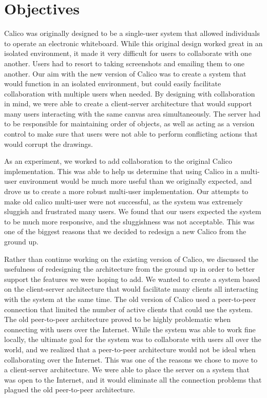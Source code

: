 \chapter{Objectives}

Calico was originally designed to be a single-user system that allowed individuals to operate an electronic whiteboard. While this original design worked great in an isolated environment, it made it very difficult for users to collaborate with one another. Users had to resort to taking screenshots and emailing them to one another.  Our aim with the new version of Calico was to create a system that would function in an isolated environment, but could easily facilitate collaboration with multiple users when needed. By designing with collaboration in mind, we were able to create a client-server architecture that would support many users interacting with the same canvas area simultaneously. The server had to be responsible for maintaining order of objects, as well as acting as a version control to make sure that users were not able to perform conflicting actions that would corrupt the drawings.

As an experiment, we worked to add collaboration to the original Calico implementation. This was able to help us determine that using Calico in a multi-user environment would be much more useful than we originally expected, and drove us to create a more robust multi-user implementation. Our attempts to make old calico multi-user were not successful, as the system was extremely sluggish and frustrated many users. We found that our users expected the system to be much more responsive, and the sluggishness was not acceptable. This was one of the biggest reasons that we decided to redesign a new Calico from the ground up.  

Rather than continue working on the existing version of Calico, we discussed the usefulness of redesigning the architecture from the ground up in order to better support the features we were hoping to add. We wanted to create a system based on the client-server architecture that would facilitate many clients all interacting with the system at the same time. The old version of Calico used a peer-to-peer connection that limited the number of active clients that could use the system. The old peer-to-peer architecture proved to be highly problematic when connecting with users over the Internet. While the system was able to work fine locally, the ultimate goal for the system was to collaborate with users all over the world, and we realized that a peer-to-peer architecture would not be ideal when collaborating over the Internet. This was one of the reasons we chose to move to a client-server architecture. We were able to place the server on a system that was open to the Internet, and it would eliminate all the connection problems that plagued the old peer-to-peer architecture. 

